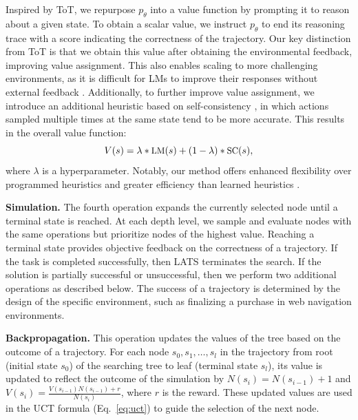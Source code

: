 \documentclass{article}
\theoremstyle{plain}
\theoremstyle{definition}
\theoremstyle{remark}
\begin{document}
Inspired by ToT, we repurpose $p_\theta$ into a value function by prompting it to reason about a given state. To obtain a scalar value, we instruct $p_\theta$ to end its reasoning trace with a score indicating the correctness of the trajectory. Our key distinction from ToT is that we obtain this value after obtaining the environmental feedback, improving value assignment. This also enables scaling to more challenging environments, as it is difficult for LMs to improve their responses without external feedback \cite{huang2023large}. Additionally, to further improve value assignment, we introduce an additional heuristic based on self-consistency \cite{wang2022self}, in which actions sampled multiple times at the same state tend to be more accurate. This results in the overall value function:
\begin{equation}
\small
    V(s) = \lambda * \text{LM}(s) + (1-\lambda) * \text{SC}(s),
\end{equation}
where $\lambda$ is a hyperparameter. Notably, our method offers enhanced flexibility over programmed heuristics \citep{campbell2002deep} and greater efficiency than learned heuristics \citep{silver2017mastering}.


\textbf{Simulation.} The fourth operation expands the currently selected node until a terminal state is reached. At each depth level, we sample and evaluate nodes with the same operations but prioritize nodes of the highest value. Reaching a terminal state provides objective feedback on the correctness of a trajectory. If the task is completed successfully, then LATS terminates the search. If the solution is partially successful or unsuccessful, then we perform two additional operations as described below. The success of a trajectory is determined by the design of the specific environment, such as finalizing a purchase in web navigation environments.

\textbf{Backpropagation.} 
This operation updates the values of the tree based on the outcome of a trajectory. For each node $s_0,s_1,\dots, s_l$ in the trajectory from root (initial state $s_0$) of the searching tree to leaf (terminal state $s_l$), its value is updated to reflect the outcome of the simulation by $N(s_i)=N(s_{i-1})+1$ and $V(s_i)=\frac{V(s_{i-1})N(s_{i-1})+r}{N(s_i)}$, where $r$ is the reward. These updated values are used in the UCT formula (Eq.~\ref{eq:uct}) to guide the selection of the next node.
\end{document}
